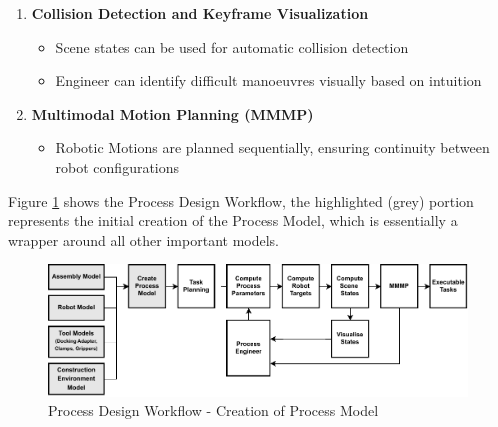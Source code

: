 \begin{enumerate}
	\item \textbf{Collision Detection and Keyframe Visualization}
	\begin{itemize}
		\item Scene states can be used for automatic collision detection
		\item Engineer can identify difficult manoeuvres visually based on intuition 
	\end{itemize}

    \item \textbf{Multimodal Motion Planning (MMMP)}
	\begin{itemize}
		\item Robotic Motions are planned sequentially, ensuring continuity between robot configurations 
	\end{itemize}
\end{enumerate}

Figure \ref{fig:process-design-1} shows the Process Design Workflow, the highlighted (grey) portion represents the initial creation of the Process Model, which is essentially a wrapper around all other important models.

\begin{figure}[!h]
    \centering
    \includegraphics[width=0.99\textwidth]{images/6a/process_1.pdf}
    \caption{Process Design Workflow - Creation of Process Model}
    \label{fig:process-design-1}
\end{figure}

